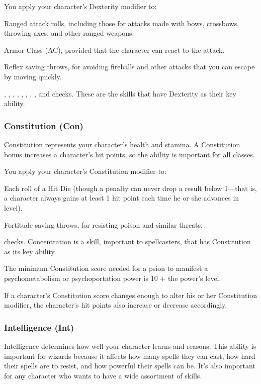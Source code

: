 You apply your character's Dexterity modifier to:
\begin{itemize*}
\item Ranged attack rolls, including those for attacks made with bows, crossbows, throwing axes, and other ranged weapons.
\item Armor Class (AC), provided that the character can react to the attack.
\item Reflex saving throws, for avoiding fireballs and other attacks that you can escape by moving quickly.
\item {}, , , , , , , , and  checks. These are the skills that have Dexterity as their key ability.
\end{itemize*}

\subsubsection{Constitution (Con)}
Constitution represents your character's health and stamina. A Constitution bonus increases a character's hit points, so the ability is important for all classes.

You apply your character's Constitution modifier to:
\begin{itemize*}
\item Each roll of a Hit Die (though a penalty can never drop a result below 1---that is, a character always gains at least 1 hit point each time he or she advances in level).
\item Fortitude saving throws, for resisting poison and similar threats.
\item {} checks. Concentration is a skill, important to spellcasters, that has Constitution as its key ability.
\end{itemize*}

The minimum Constitution score needed for a psion to manifest a psychometabolism or psychoportation power is 10 + the power's level.

If a character's Constitution score changes enough to alter his or her Constitution modifier, the character's hit points also increase or decrease accordingly.

\subsubsection{Intelligence (Int)}
Intelligence determines how well your character learns and reasons. This ability is important for wizards because it affects how many spells they can cast, how hard their spells are to resist, and how powerful their spells can be. It's also important for any character who wants to have a wide assortment of skills.

